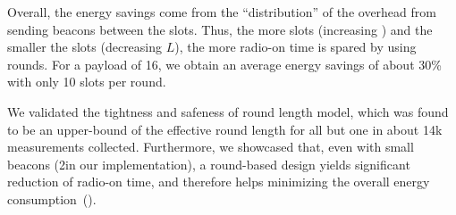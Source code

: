 Overall, the energy savings come from the ``distribution'' of the overhead from sending beacons between the slots. Thus, the more slots (increasing \nslots) and the smaller the slots (decreasing $L$), the more radio-on time is spared by using rounds.
For a payload of 16\bytes, we obtain an average energy savings of about 30\% with only 10 slots per round.


We validated the tightness and safeness of \TTnet round length model, which was found to be an upper-bound of the effective round length for all but one in about 14k measurements collected.
Furthermore, we showcased that, even with small beacons (2\bytes in our implementation), a round-based design yields significant reduction of radio-on time, and therefore helps minimizing the overall energy consumption~().
